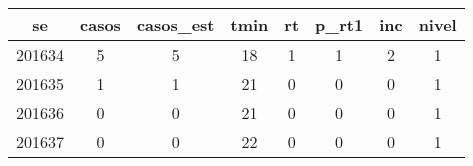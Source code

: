 \begin{tabular}{c|ccccccc}
  \hline
se & casos & casos\_est & tmin & rt & p\_rt1 & inc & nivel \\ 
  \hline
201634 & 5 & 5 & 18 & 1 & 1 & 2 & 1 \\ 
  201635 & 1 & 1 & 21 & 0 & 0 & 0 & 1 \\ 
  201636 & 0 & 0 & 21 & 0 & 0 & 0 & 1 \\ 
  201637 & 0 & 0 & 22 & 0 & 0 & 0 & 1 \\ 
   \hline
\end{tabular}
